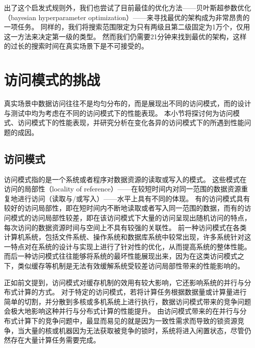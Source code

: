 出了这个启发式规则外，我们也尝试了目前最佳的优化方法{------}贝叶斯超参数优化（bayesian hyperparameter optimization）{------}来寻找最优的{\li}架构成为非常昂贵的一项任务。
同样的，我们将搜索范围限定为只有两级且第二级固定为1万个{\lr}，仅用这一方法来决定第一级的{\model}类型。
然而我们仍需要21分钟来找到最优的架构，这样的过长的搜索时间在真实场景下是不可接受的。


\section{访问模式的挑战}

真实场景中数据访问往往不是均匀分布的，而是展现出不同的访问模式，而{\li}的设计与测试中均为考虑在不同的访问模式下的性能表现。
本小节将探讨何为访问模式、访问模式下{\li}的性能表现，并研究分析{\li}在变化各异的访问模式下的所遇到性能问题的成因。

\subsection{访问模式}

访问模式指的是一个系统或者程序对数据资源的读取或写入的模式。
这些模式在访问的局部性（locality of reference）{------}在较短时间内对同一范围的数据资源重复地进行访问（读取与/或写入）{------}水平上具有不同的体现。
有的访问模式具有较好的访问局部性，即在短时间内不断地读取或者写入同一范围的数据，而有的访问模式的访问局部性较差，即在该访问模式下大量的访问呈现出随机访问的特点，
每次访问的数据资源时间与空间上不具有较强的关联性。
前一种访问模式在各类计算机系统，包括文件系统、操作系统和数据库系统中较常出现，许多系统针对这一特点对在系统的设计与实现上进行了针对性的优化，从而提高系统的整体性能。
而后一种访问模式往往能够将系统的最坏性能展现出来，因为在这类访问模式之下，类似缓存等机制是无法有效缓解系统受较差访问局部性带来的性能影响的。

正如前文提到，访问模式对缓存机制的效用有较大影响，它还影响系统的并行与分布式计算的方式。
对于特定的访问模式，若将计算任务根据数据量或计算量进行简单的切割，并分散到多核或多机系统上进行执行，数据访问模式带来的竞争问题会极大地影响这种并行与分布式计算的性能提升。
由访问模式带来的在并行与分布式计算下的竞争问题中，最显而易见的就是因为一致性需求而导致的锁资源竞争，当大量的核或机器因为无法获取被竞争的锁时，系统将进入闲置状态，尽管仍然存在大量计算任务需要完成。

